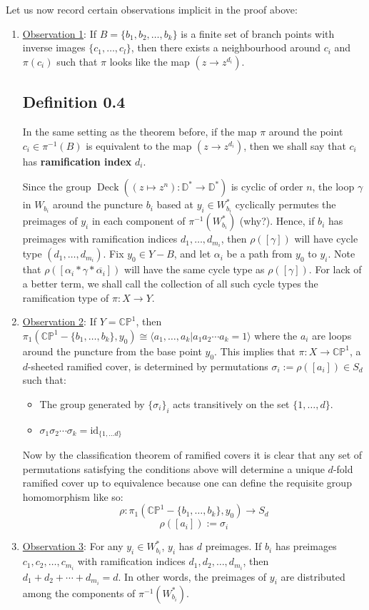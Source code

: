 \documentclass[11pt,a4paper]{article}
\begin{document}

Let us now record certain observations implicit in the proof above:
\begin{enumerate}
    \item \underline{Observation 1}: If $B = \{b_1, b_2,\ldots, b_k\}$ is a finite set of branch points with inverse images $\{c_1, \ldots, c_l\}$, then there exists a neighbourhood around $c_i$ and $\pi(c_i)$ such that $\pi$ looks like the map $(z\rightarrow z^{d_i})$.
\subsection*{Definition 0.4}
    In the same setting as the theorem before, if the map $\pi$ around the point $c_i \in \pi^{-1}(B)$ is equivalent to the map $(z\rightarrow z^{d_i})$, then we shall say that $c_i$ has \textbf{ramification index} $d_i$.


Since the group $\operatorname{Deck}((z\mapsto z^n):\mathbb D^*\to\mathbb D^*)$ is cyclic of order $n$, the loop $\gamma$ in $W_{b_i}$ around the puncture $b_i$ based at $y_i \in W_{b_i}^*$ cyclically permutes the preimages of $y_i$ in each component of $\pi^{-1}(W_{b_i}^*)$ (why?). Hence, if $b_i$ has preimages with ramification indices $d_1,\ldots,d_{m_i}$, then $\rho([\gamma])$ will have cycle type $(d_1,\ldots,d_{m_i})$. Fix $y_0\in Y-B$, and let $\alpha_i$ be a path from $y_0$ to $y_i$. Note that $\rho([\alpha_i*\gamma*\overline{\alpha_i}])$ will have the same cycle type as $\rho([\gamma])$. For lack of a better term, we shall call the collection of all such cycle types the ramification type of $\pi:X \rightarrow Y$.
\item \underline{Observation 2}: If $Y = \mathbb{CP}^1$, then $\pi_1(\mathbb{CP}^1 - \{b_1, \ldots, b_k\}, y_0) \cong \langle a_1, \ldots, a_k  |  a_1a_2\cdots a_k = 1\rangle$ where the $a_i$ are loops around the puncture from the base point $y_0$. This implies that $\pi:X\rightarrow \mathbb{CP}^1$, a $d$-sheeted ramified cover, is determined by permutations $\sigma_i := \rho([a_i]) \in S_d$ such that:
\begin{itemize}
    \item The group generated by $\{\sigma_i\}_i$ acts transitively on the set $\{1,\ldots,d\}$.
    \item $\sigma_1\sigma_2\cdots \sigma_k = \text{id}_{\{1,\ldots d\}}$
\end{itemize}
Now by the classification theorem of ramified covers it is clear that any set of permutations satisfying the conditions above will determine a unique $d$-fold ramified cover up to equivalence because one can define the requisite group homomorphism like so:
$$\rho:\pi_1(\mathbb{CP}^1 - \{b_1, \ldots, b_k\}, y_0) \rightarrow S_d$$
$$\rho([a_i]):= \sigma _i$$
\item \underline{Observation 3}: For any $y_i \in W_{b_i}^*$, ${y_i}$ has $d$ preimages. If $b_i$ has preimages $c_1, c_2, \ldots, c_{m_i}$ with ramification indices $d_1, d_2, \ldots, d_{m_i}$, then $d_1 + d_2 + \cdots + d_{m_i} = d$. In other words, the preimages of $y_i$ are distributed among the components of $\pi^{-1}(W_{b_i}^*)$.
\end{enumerate}
\end{document}
